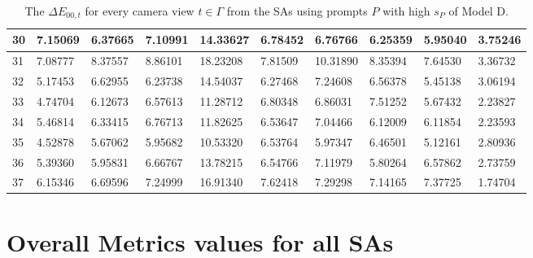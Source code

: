 \begin{table}[H]
{\begin{tabular}{|l|l|l|l|l|l|l|l|l|l|}
        30 & 7.15069 & 6.37665 & 7.10991 & 14.33627 & 6.78452 & 6.76766 & 6.25359 & 5.95040 & 3.75246 \\ \hline
        31 & 7.08777 & 8.37557 & 8.86101 & 18.23208 & 7.81509 & 10.31890 & 8.35394 & 7.64530 & 3.36732 \\ \hline
        32 & 5.17453 & 6.62955 & 6.23738 & 14.54037 & 6.27468 & 7.24608 & 6.56378 & 5.45138 & 3.06194 \\ \hline
        33 & 4.74704 & 6.12673 & 6.57613 & 11.28712 & 6.80348 & 6.86031 & 7.51252 & 5.67432 & 2.23827 \\ \hline
        34 & 5.46814 & 6.33415 & 6.76713 & 11.82625 & 6.53647 & 7.04466 & 6.12009 & 6.11854 & 2.23593 \\ \hline
        35 & 4.52878 & 5.67062 & 5.95682 & 10.53320 & 6.53764 & 5.97347 & 6.46501 & 5.12161 & 2.80936 \\ \hline
        36 & 5.39360 & 5.95831 & 6.66767 & 13.78215 & 6.54766 & 7.11979 & 5.80264 & 6.57862 & 2.73759 \\ \hline
        37 & 6.15346 & 6.69596 & 7.24999 & 16.91340 & 7.62418 & 7.29298 & 7.14165 & 7.37725 & 1.74704 \\ \hline
    \end{tabular}}
	\caption{The $ \Delta E_{00,t}$ for every camera view $t \in \varGamma$ from the SAs using prompts $P$ with high $s_P$ of Model D.}

\end{table}

\section{Overall Metrics values for all SAs}

